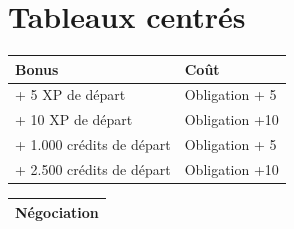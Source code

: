 \documentclass{article}
\begin{document}
\section*{Tableaux centrés}
\begin{center}
	\begin{tabular}{|p{4.5cm}|p{4cm}|}
		\hline 
		\cellcolor{DarkRed} {\large \textcolor{PureWhite}{\textbf{Bonus}}} & \cellcolor{DarkRed} {\large \textcolor{PureWhite}{\textbf{Coût}}} \\
		\hline 
		+ 5 XP de départ & Obligation + 5 \\
		\hline 
		+ 10 XP de départ & Obligation +10 \\
		\hline
		+ 1.000 crédits de départ & Obligation + 5 \\
		\hline
		+ 2.500 crédits de départ & Obligation +10 \\
		\hline
	\end{tabular}
	\vspace{0.5cm} %
	\par %
	\begin{tabular}[b]{|p{5cm}|p{1cm}|}
		\hline 
		\multicolumn{2}{|c|}{\cellcolor{DarkRed} \textbf{{\large \textcolor{PureWhite}{Négociation}}}} \\ 
		\hline 

\end{tabular}
\end{center}
\end{document}
